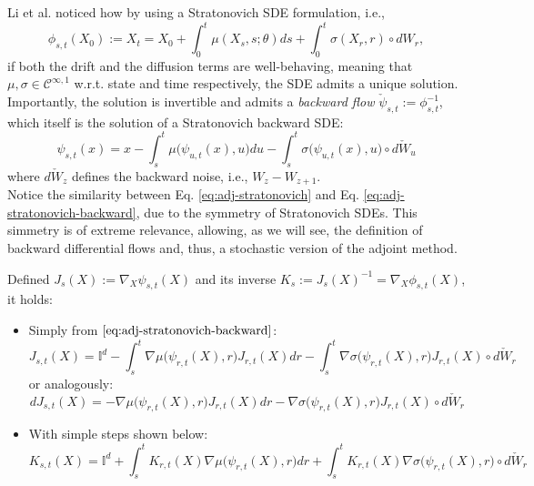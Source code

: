 \documentclass[11pt]{article}
\begin{document}
Li et al. \cite{li2020scalable} noticed how by using a Stratonovich SDE formulation, i.e.,
\begin{equation}
  \phi_{s,t}(X_0) := X_t = X_0 + \int_0^t \mu(X_s, s; \theta)ds + \int_0^t \sigma(X_r, r) \circ dW_r, \label{eq:adj-stratonovich}
\end{equation}
if both the drift and the diffusion terms are well-behaving, meaning that $\mu, \sigma \in \mathcal{C}^{\infty, 1}$ w.r.t. state and time respectively, the SDE admits a unique solution. \\ 
Importantly, the solution is invertible and admits a \textit{backward flow} $\check \psi_{s,t} := \phi_{s,t}^{-1}$, which itself is the solution of a Stratonovich backward SDE:
\begin{equation}
  \psi_{s,t}(x) = x - \int_s^t \mu\big(\psi_{u,t}(x), u\big)du - \int_s^t\sigma\big(\psi_{u,t}(x), u\big) \circ d\check W_u \label{eq:adj-stratonovich-backward} 
\end{equation}
where $d\check W_{z}$ defines the backward noise, i.e., $W_{z} - W_{z+1}$.\\ 

Notice the similarity between Eq. \ref{eq:adj-stratonovich} and Eq. \ref{eq:adj-stratonovich-backward}, due to the symmetry of Stratonovich SDEs. 
This simmetry is of extreme relevance, allowing, as we will see, the definition of backward differential flows and, thus, a stochastic version of the adjoint method.

Defined $J_s(X) := \nabla_X \psi_{s,t}(X)$ and its inverse $K_s := J_s(X)^{-1} = \nabla_X \phi_{s, t}(X) $, it holds:
\begin{itemize}
  \item Simply from $\ref{eq:adj-stratonovich-backward}$:
  \begin{equation}
    J_{s,t}(X) = \mathbb{I}^d - \int_s^t \nabla \mu\big(\psi_{r,t}(X), r\big) J_{r,t}(X)dr - \int_s^t \nabla \sigma \big(\psi_{r,t}(X), r \big)J_{r,t}(X) \circ d\check W_r \label{eq:adj-j}
  \end{equation}
  or analogously:
  \begin{equation}
    d J_{s,t}(X) = - \nabla \mu\big(\psi_{r,t}(X), r\big) J_{r,t}(X)dr - \nabla \sigma \big(\psi_{r,t}(X), r \big)J_{r,t}(X) \circ d\check W_r \label{eq:adj-j-2}
  \end{equation}
  \item With simple steps shown below:
  \begin{equation}
    K_{s, t}(X) = \mathbb{I}^d + \int_s^t K_{r,t}(X)\nabla \mu \big(\psi_{r,t}(X),r \big) dr + \int_s^t K_{r,t}(X)\nabla \sigma \big(\psi_{r,t}(X),r \big) \circ d\check W_r \label{eq:adj-k}
  \end{equation}
\end{itemize}
\end{document}
